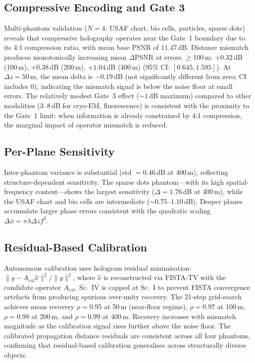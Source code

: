 \documentclass[11pt]{article}
\theoremstyle{definition}
\begin{document}
\subsection{Compressive Encoding and Gate 3}
Multi-phantom validation ($N{=}4$: USAF chart, bio cells, particles, sparse dots) reveals that compressive holography operates near the Gate~1 boundary due to its 4:1 compression ratio, with mean base PSNR of $11.47$\,dB.
Distance mismatch produces monotonically increasing mean $\Delta$PSNR at errors $\geq 100$\,\textmu m: $+0.32$\,dB (100\,\textmu m), $+0.38$\,dB (200\,\textmu m), $+1.04$\,dB (400\,\textmu m) (95\% CI: $[0.645, 1.595]$).
At $\Delta z{=}50$\,\textmu m, the mean delta is $-0.19$\,dB (not significantly different from zero; CI includes 0), indicating the mismatch signal is below the noise floor at small errors.
The relatively modest Gate~3 effect (${\sim}1$\,dB maximum) compared to other modalities ($3$--$8$\,dB for cryo-EM, fluorescence) is consistent with the proximity to the Gate~1 limit: when information is already constrained by 4:1 compression, the marginal impact of operator mismatch is reduced.

\subsection{Per-Plane Sensitivity}
Inter-phantom variance is substantial (std $= 0.46$\,dB at 400\,\textmu m), reflecting structure-dependent sensitivity. The sparse dots phantom---with its high spatial-frequency content---shows the largest sensitivity ($\Delta{=}1.76$\,dB at 400\,\textmu m), while the USAF chart and bio cells are intermediate (${\sim}0.75$--$1.10$\,dB). Deeper planes accumulate larger phase errors consistent with the quadratic scaling $\Delta\phi = \pi\lambda\Delta z f^2$.

\subsection{Residual-Based Calibration}
Autonomous calibration uses hologram residual minimisation: $\|y - A_{\mathrm{cal}}\hat{x}\|^2 / \|y\|^2$, where $\hat{x}$ is reconstructed via FISTA-TV with the candidate operator $A_{\mathrm{cal}}$. Sc.~IV is capped at Sc.~I to prevent FISTA convergence artefacts from producing spurious over-unity recovery. The 21-step grid-search achieves mean recovery $\rho = 0.95$ at 50\,\textmu m (near-floor regime), $\rho = 0.97$ at 100\,\textmu m, $\rho = 0.98$ at 200\,\textmu m, and $\rho = 0.99$ at 400\,\textmu m. Recovery increases with mismatch magnitude as the calibration signal rises further above the noise floor. The calibrated propagation distance residuals are consistent across all four phantoms, confirming that residual-based calibration generalises across structurally diverse objects.
\end{document}
